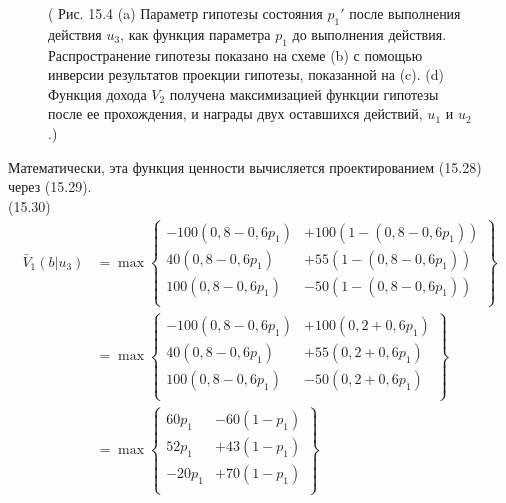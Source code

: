 \documentclass[10pt,a4paper]{article}
\begin{document}
\begin{figure}[H]
	\caption{ ( Рис. 15.4  (a) Параметр гипотезы состояния $p_1'$  после выполнения действия $u_3$, как функция параметра $p_1$ до выполнения действия. Распространение гипотезы показано на схеме (b) с помощью инверсии результатов проекции гипотезы, показанной на (c). (d) Функция дохода $V_2$ получена максимизацией функции гипотезы после ее прохождения, и награды двух оставшихся действий, $u_1$ и $u_2$.) }
	\label{fig:154orig}
\end{figure}

Математически, эта функция ценности вычисляется проектированием (15.28) через (15.29).\\

(15.30)
\begin{equation*}
\begin{split}
\bar{V}_1(b|u_3)&=\max\left\{
\begin{array}{rr}
-100(0,8-0,6p_1)&+100(1-(0,8-0,6p_1))\\
40(0,8-0,6p_1)&+55(1-(0,8-0,6p_1))\\
100(0,8-0,6p_1)&-50(1-(0,8-0,6p_1))\\
\end{array}
\right\}\\
&=\max\left\{
\begin{array}{rr}
-100(0,8-0,6p_1)&+100(0,2+0,6p_1)\\
40(0,8-0,6p_1)&+55(0,2+0,6p_1)\\
100(0,8-0,6p_1)&-50(0,2+0,6p_1)\\
\end{array}
\right\}\\
&=\max\left\{
\begin{array}{rr}
60p_1&-60(1-p_1)\\
52p_1&+43(1-p_1)\\
-20p_1&+70(1-p_1)\\
\end{array}
\right\}
\end{split}
\end{equation*}
\end{document}
